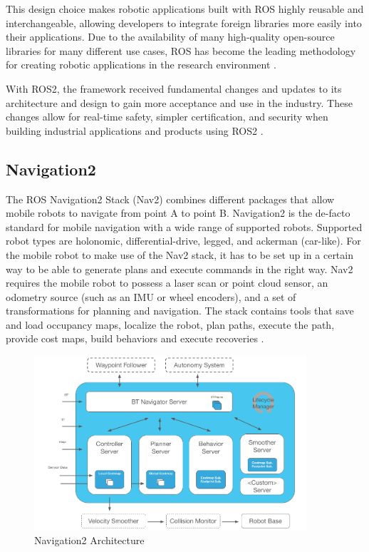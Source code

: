 This design choice makes robotic applications built with ROS highly reusable and interchangeable, allowing developers to integrate foreign libraries more easily into their applications. Due to the availability of many high-quality open-source libraries for many different use cases, ROS has become the leading methodology for creating robotic applications in the research environment \cite{quigley2009}. 

With ROS2, the framework received fundamental changes and updates to its architecture and design to gain more acceptance and use in the industry. These changes allow for real-time safety, simpler certification, and security when building industrial applications and products using ROS2 \cite{ros2022}. 

\subsection{Navigation2}

The ROS Navigation2 Stack (Nav2) combines different packages that allow mobile robots to navigate from point A to point B. Navigation2 is the de-facto standard for mobile navigation with a wide range of supported robots. Supported robot types are holonomic, differential-drive, legged, and ackerman (car-like). For the mobile robot to make use of the Nav2 stack, it has to be set up in a certain way to be able to generate plans and execute commands in the right way. Nav2 requires the mobile robot to possess a laser scan or point cloud sensor, an odometry source (such as an IMU or wheel encoders), and a set of transformations for planning and navigation. 
The stack contains tools that save and load occupancy maps, localize the robot, plan paths, execute the path, provide cost maps, build behaviors and execute recoveries \cite{macenski2020}. 

\begin{figure}[ht]
	\centering
	\includegraphics[width=0.9\textwidth]{images/nav2_architecture.png}
	\caption{Navigation2 Architecture \cite{macenski2020}}
	\label{fig:nav_architecture}
\end{figure}

